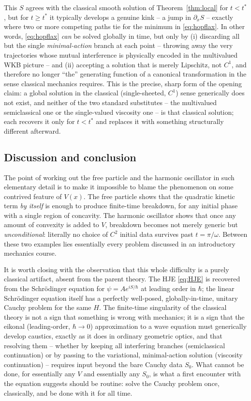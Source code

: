 This $S$ agrees with the classical smooth solution of Theorem~\ref{thm:local}
for $t<t^\ast$, but for $t\ge t^\ast$ it typically develops a genuine kink -- a
jump in $\partial_xS$ -- exactly where two or more competing paths tie for the
minimum in \eqref{eq:hopflax}. In other words, \eqref{eq:hopflax} \emph{can} be
solved globally in time, but only by (i) discarding all but the single
\emph{minimal-action} branch at each point -- throwing away the very
trajectories whose mutual interference is physically encoded in the multivalued
WKB picture -- and (ii) accepting a solution that is merely Lipschitz, not
$C^1$, and therefore no longer ``the'' generating function of a canonical
transformation in the sense classical mechanics requires. This is the precise,
sharp form of the opening claim: a global solution in the classical
(single-sheeted, $C^1$) sense generically does not exist, and neither of the
two standard substitutes -- the multivalued semiclassical one or the
single-valued viscosity one -- is that classical solution; each recovers it
only for $t<t^\ast$ and replaces it with something structurally different
afterward.

\subsection{Discussion and conclusion}

The point of working out the free particle and the harmonic oscillator in such
elementary detail is to make it impossible to blame the phenomenon on some
contrived feature of $V(x)$. The free particle shows that the quadratic kinetic
term \emph{by itself} is enough to produce finite-time breakdown, for any
initial phase with a single region of concavity. The harmonic oscillator shows
that once any amount of convexity is added to $V$, breakdown becomes not merely
generic but \emph{unconditional}: literally no choice of $C^2$ initial data
survives past $t=\pi/\omega$. Between these two examples lies essentially every
problem discussed in an introductory mechanics course.

It is worth closing with the observation that this whole difficulty is a purely
classical artifact, absent from the parent theory. The HJE \eqref{eq:HJE} is
recovered from the Schr\"odinger equation for $\psi=Ae^{iS/\hbar}$ at leading
order in $\hbar$; the linear Schr\"odinger equation itself has a perfectly
well-posed, globally-in-time, unitary Cauchy problem for the same $H$. The
finite-time singularity of the classical theory is not a sign that something is
wrong with mechanics; it is a sign that the eikonal (leading-order,
$\hbar\to0$) approximation to a wave equation must generically develop
caustics, exactly as it does in ordinary geometric optics, and that resolving
them -- whether by keeping all interfering branches (semiclassical
continuation) or by passing to the variational, minimal-action solution
(viscosity continuation) -- requires input beyond the bare Cauchy data $S_0$.
What cannot be done, for essentially any $V$ and essentially any $S_0$, is what
a first encounter with the equation suggests should be routine: solve the
Cauchy problem once, classically, and be done with it for all time.


